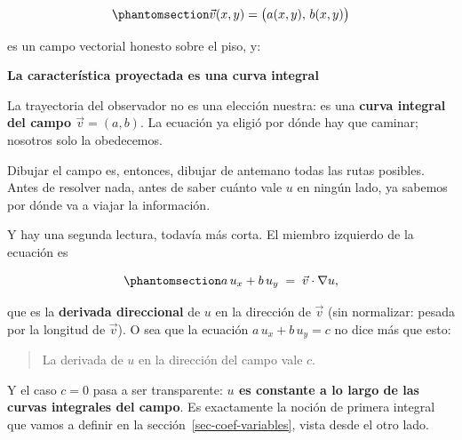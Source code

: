 \documentclass[
  spanish,
  a4paper,
]{scrbook}
\theoremstyle{definition}
\theoremstyle{plain}
\theoremstyle{definition}
\theoremstyle{plain}
\theoremstyle{definition}
\theoremstyle{remark}
\begin{document}
\begin{equation}\protect\phantomsection\label{eq-campo-piso}{
\vec v(x,y) = \big(a(x,y),\, b(x,y)\big)
}\end{equation}

es un campo vectorial honesto sobre el piso, y:

\begin{tcolorbox}[enhanced jigsaw, arc=.35mm, bottomrule=.15mm, breakable, colback=white, colframe=quarto-callout-important-color-frame, left=2mm, leftrule=.75mm, opacityback=0, rightrule=.15mm, toprule=.15mm]
\begin{minipage}[t]{5.5mm}
\textcolor{quarto-callout-important-color}{\faExclamation}
\end{minipage}%
\begin{minipage}[t]{\textwidth - 5.5mm}

\vspace{-3mm}\textbf{La característica proyectada es una curva integral}\vspace{3mm}

La trayectoria del observador no es una elección nuestra: es una
\textbf{curva integral del campo \(\vec v = (a,b)\)}. La ecuación ya
eligió por dónde hay que caminar; nosotros solo la obedecemos.

Dibujar el campo es, entonces, dibujar de antemano todas las rutas
posibles. Antes de resolver nada, antes de saber cuánto vale \(u\) en
ningún lado, ya sabemos por dónde va a viajar la información.

\end{minipage}%
\end{tcolorbox}

Y hay una segunda lectura, todavía más corta. El miembro izquierdo de la
ecuación es

\begin{equation}\protect\phantomsection\label{eq-derivada-direccional}{
a\,u_x + b\,u_y \;=\; \vec v \cdot \nabla u ,
}\end{equation}

que es la \textbf{derivada direccional} de \(u\) en la dirección de
\(\vec v\) (sin normalizar: pesada por la longitud de \(\vec v\)). O sea
que la ecuación \(a\,u_x + b\,u_y = c\) no dice más que esto:

\begin{quote}
La derivada de \(u\) en la dirección del campo vale \(c\).
\end{quote}

Y el caso \(c = 0\) pasa a ser transparente: \textbf{\(u\) es constante
a lo largo de las curvas integrales del campo}. Es exactamente la noción
de primera integral que vamos a definir en la
sección~\ref{sec-coef-variables}, vista desde el otro lado.
\end{document}
